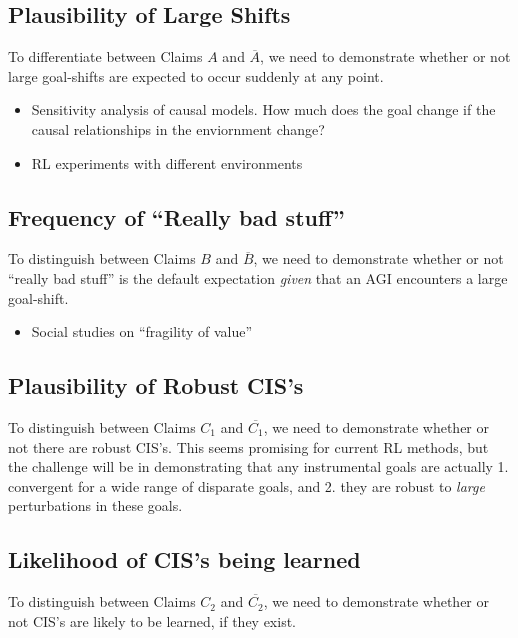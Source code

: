 \documentclass{article}
\begin{document}
\subsection{Plausibility of Large Shifts}
To differentiate between Claims $A$ and $\overline{A}$, we need to demonstrate whether or not large goal-shifts are expected to occur suddenly at any point. 
\begin{itemize}
    \item Sensitivity analysis of causal models. How much does the goal change if the causal relationships in the enviornment change?
    \item RL experiments with different environments
\end{itemize}

\subsection{Frequency of ``Really bad stuff”}
To distinguish between Claims $B$ and $\overline{B}$, we need to demonstrate whether or not “really bad stuff” is the default expectation \emph{given} that an AGI encounters a large goal-shift.
\begin{itemize}
    \item Social studies on “fragility of value”
\end{itemize}

\subsection{Plausibility of Robust CIS's}
To distinguish between Claims $C_1$ and $\overline{C_1}$, we need to demonstrate whether or not there are robust CIS's. This seems promising for current RL methods, but the challenge will be in demonstrating that any instrumental goals are actually 1. convergent for a wide range of disparate goals, and 2. they are robust to \emph{large} perturbations in these goals.

\subsection{Likelihood of CIS's being learned}
To distinguish between Claims $C_2$ and $\overline{C_2}$, we need to demonstrate whether or not CIS's are likely to be learned, if they exist.
\end{document}
